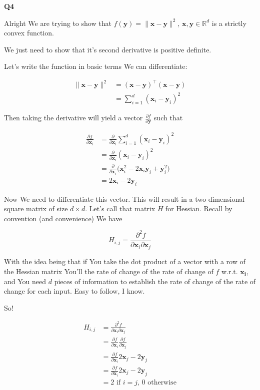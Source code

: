 \documentclass{article}
\begin{document}
	\textbf{Q4}
	
		Alright We are trying to show that $f(\mathbf{y}) = \|\mathbf{x} - \mathbf{y}\|^2$, $\mathbf{x, y}\in\mathbb{R}^d$ is a strictly convex function.
		
		We just need to show that it's second derivative is positive definite.
		
		Let's write the function in basic terms We can differentiate:
		
		\begin{align}
			\|\mathbf{x-y}\|^2 & = (\mathbf{x-y})^\top (\mathbf{x-y})\\
			& = \sum^d_{i=1} (\mathbf{x}_i - \mathbf{y}_i)^2
		\end{align}
		 
		Then taking the derivative will yield a vector $\frac{\partial f}{\partial \mathbf{y}}$ such that 
		
		\begin{align}
			\frac{\partial f}{\partial \mathbf{x}_i} 	&=  \frac{\partial }{\partial \mathbf{x}_i}  \sum^d_{i=1} (\mathbf{x}_i - \mathbf{y}_i)^2\\
			&= \frac{\partial }{\partial \mathbf{x}_i}  (\mathbf{x}_i - \mathbf{y}_i)^2\\
			&= \frac{\partial }{\partial \mathbf{x}_i} \big( \mathbf{x}_i^2  - 2\mathbf{x}_i \mathbf{y}_i + \mathbf{y}_i^2 \big)\\
			&= 2\mathbf{x}_i  - 2\mathbf{y}_i 
		\end{align}
		
		Now We need to differentiate this vector. This will result in a two dimensional square matrix of size $d\times d$. Let's call that matrix $H$ for Hessian. Recall by convention (and convenience) We have
		
		\[ H_{i, j} = \frac{\partial^2 f}{\partial \mathbf{x}_i \partial\mathbf{x}_j} \]
		
		With the idea being that if You take the dot product of a vector with a row of the Hessian matrix You'll the rate of change of the rate of change of $f$ w.r.t. $\mathbf{x_i}$, and You need $d$ pieces of information to establish the rate of change of the rate of change for each input. Easy to follow, I know.
		
		So!
		
		\begin{align}
			H_{i, j} &=  \frac{\partial^2 f}{\partial \mathbf{x}_i \partial\mathbf{x}_j}\\
			&=  \frac{\partial f}{\partial \mathbf{x}_i } \frac{\partial f}{\partial \mathbf{x}_j}\\ 
			&=  \frac{\partial f}{\partial \mathbf{x}_i } 2\mathbf{x}_j  - 2\mathbf{y}_j \\ 
			&=  \frac{\partial f}{\partial \mathbf{x}_i } 2\mathbf{x}_j - 2\mathbf{y}_j\\
			&=  \text{2 if }i=j\text{, 0 otherwise}
		\end{align}
		
\end{document}

